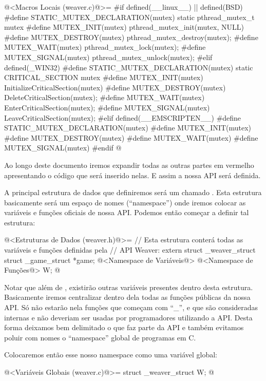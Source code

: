 \iniciocodigo
@<Macros Locais (weaver.c)@>=
#if defined(__linux__) || defined(BSD)
#define STATIC_MUTEX_DECLARATION(mutex) static pthread_mutex_t mutex
#define MUTEX_INIT(mutex) pthread_mutex_init(mutex, NULL)
#define MUTEX_DESTROY(mutex) pthread_mutex_destroy(mutex);
#define MUTEX_WAIT(mutex) pthread_mutex_lock(mutex);
#define MUTEX_SIGNAL(mutex) pthread_mutex_unlock(mutex);
#elif defined(_WIN32)
#define STATIC_MUTEX_DECLARATION(mutex) static CRITICAL_SECTION mutex
#define MUTEX_INIT(mutex) InitializeCriticalSection(mutex)
#define MUTEX_DESTROY(mutex) DeleteCriticalSection(mutex);
#define MUTEX_WAIT(mutex) EnterCriticalSection(mutex);
#define MUTEX_SIGNAL(mutex) LeaveCriticalSection(mutex);
#elif defined(__EMSCRIPTEN__)
#define STATIC_MUTEX_DECLARATION(mutex)
#define MUTEX_INIT(mutex)
#define MUTEX_DESTROY(mutex)
#define MUTEX_WAIT(mutex)
#define MUTEX_SIGNAL(mutex)
#endif
@
\fimcodigo

Ao longo deste documento iremos expandir todas as outras partes em
vermelho apresentando o código que será inserido nelas. E assim a
nossa API será definida.


A principal estrutura de dados que definiremos será
um  chamado . Esta estrutura
basicamente será um espaço de nomes (``namespace'') onde iremos
colocar as variáveis e funções oficiais de nossa API. Podemos então
começar a definir tal estrutura:

\iniciocodigo
@<Estruturas de Dados (weaver.h)@>=
// Esta estrutura conterá todas as variáveis e funções definidas pela
// API Weaver:
extern struct _weaver_struct{
  struct _game_struct *game;
  @<Namespace de Variáveis@>
  @<Namespace de Funções@>
} W;
@
\fimcodigo

Notar que além de , existirão outras variáveis
presentes dentro desta estrutura. Basicamente iremos centralizar
dentro dela todas as funções públicas da nossa API. Só não estarão
nela funções que começam com ``\_'', e que são consideradas internas e
não deveriam ser usadas por programadores utilizando a API. Desta
forma deixamos bem delimitado o que faz parte da API e também evitamos
poluir com nomes o ``namespace'' global de programas em C.

Colocaremos então esse nosso namespace como uma variável global:

\iniciocodigo
@<Variáveis Globais (weaver.c)@>=
struct _weaver_struct W;
@
\fimcodigo



